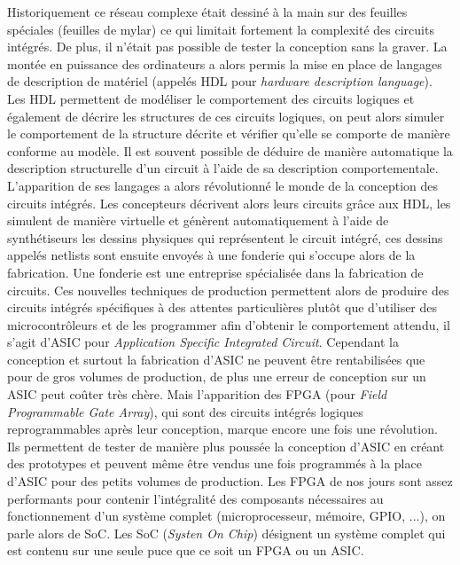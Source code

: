 Historiquement ce réseau complexe était dessiné à la main sur des feuilles spéciales
(feuilles de mylar) ce qui limitait fortement la complexité des circuits intégrés. De
plus, il n'était pas possible de tester la conception sans la graver. La montée en
puissance des ordinateurs a alors permis la mise en place de langages de description
de matériel (appelés HDL pour \textit{hardware description language}). Les HDL
permettent de modéliser le comportement des circuits logiques et également de décrire
les structures de ces circuits logiques, on peut alors simuler le comportement de la
structure décrite et vérifier qu'elle se comporte de manière conforme au modèle. Il
est souvent possible de déduire de manière automatique la description structurelle
d'un circuit à l'aide de sa description comportementale. L'apparition de ses langages
a alors révolutionné le monde de la conception des circuits intégrés. Les concepteurs
décrivent alors leurs circuits grâce aux HDL, les simulent de manière virtuelle et
génèrent automatiquement à l'aide de synthétiseurs les dessins physiques qui
représentent le circuit intégré, ces dessins appelés netlists sont ensuite envoyés à
une fonderie qui s'occupe alors de la fabrication. Une fonderie est une entreprise
spécialisée dans la fabrication de circuits. Ces nouvelles techniques de production
permettent alors de produire des circuits intégrés spécifiques à des attentes
particulières plutôt que d'utiliser des microcontrôleurs et de les programmer afin
d'obtenir le comportement attendu, il s'agit d'ASIC pour \textit{Application Specific
Integrated Circuit}. Cependant la conception et surtout la fabrication d'ASIC ne
peuvent être rentabilisées que pour de gros volumes de production, de plus une erreur
de conception sur un ASIC peut coûter très chère. Mais l'apparition des FPGA (pour
\textit{Field Programmable Gate Array}), qui sont des circuits intégrés logiques
reprogrammables après leur conception, marque encore une fois une révolution.  Ils
permettent de tester de manière plus poussée la conception d'ASIC en créant des
prototypes et peuvent même être vendus une fois programmés à la place d'ASIC pour des
petits volumes de production. Les FPGA de nos jours sont assez performants pour
contenir l'intégralité des composants nécessaires au fonctionnement d'un système
complet (microprocesseur, mémoire, GPIO, ...), on parle alors de SoC. Les SoC
(\textit{Systen On Chip}) désignent un système complet qui est contenu sur une seule
puce que ce soit un FPGA ou un ASIC.

